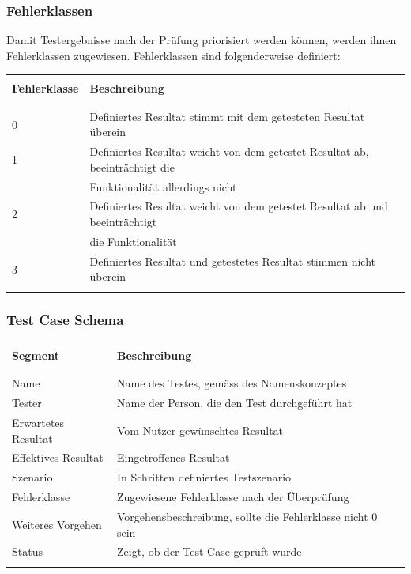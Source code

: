 \subsubsection{Fehlerklassen}
Damit Testergebnisse nach der Prüfung priorisiert werden können, werden ihnen Fehlerklassen zugewiesen.
\newline
Fehlerklassen sind folgenderweise definiert:
\begin{table}[htp]
  \begin{tabularx}{\textwidth}{l l X}\hline \\
  \textbf{Fehlerklasse} & \textbf{Beschreibung} \\ \\\hline \\
  0 & Definiertes Resultat stimmt mit dem getesteten Resultat überein \\
  1 & Definiertes Resultat weicht von dem getestet Resultat ab, beeinträchtigt die \\
    & Funktionalität allerdings nicht \\
  2 & Definiertes Resultat weicht von dem getestet Resultat ab und beeinträchtigt \\
    & die Funktionalität \\
  3 & Definiertes Resultat und getestetes Resultat stimmen nicht überein \\
  \\\hline
  \end{tabularx}
\end{table}
\pagebreak
\subsubsection{Test Case Schema}
\begin{table}[htp]
  \begin{tabularx}{\textwidth}{l l X}\hline \\
  \textbf{Segment} & \textbf{Beschreibung} \\ \\\hline \\
  Name & Name des Testes, gemäss des Namenskonzeptes \\
  Tester & Name der Person, die den Test durchgeführt hat \\
  Erwartetes Resultat & Vom Nutzer gewünschtes Resultat \\
  Effektives Resultat & Eingetroffenes Resultat \\
  Szenario & In Schritten definiertes Testszenario \\
  Fehlerklasse & Zugewiesene Fehlerklasse nach der Überprüfung \\
  Weiteres Vorgehen & Vorgehensbeschreibung, sollte die Fehlerklasse nicht 0 sein \\
  Status & Zeigt, ob der Test Case geprüft wurde \\
  \\\hline
  \end{tabularx}
\end{table}
